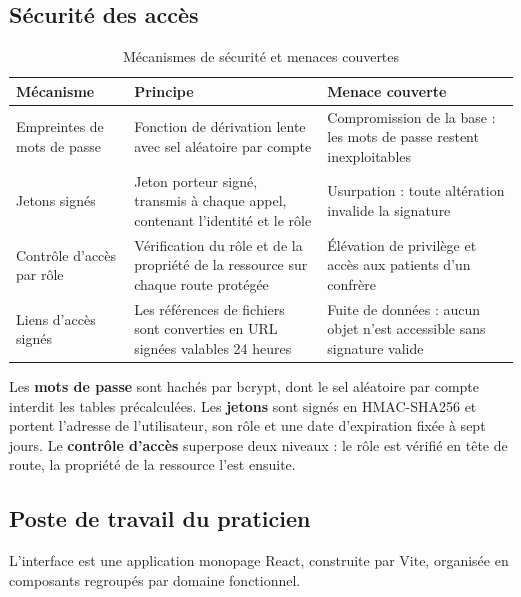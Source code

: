 
\subsection{Sécurité des accès}

\begin{table}[H]
\centering

\small
\begin{tabular}{@{}L{3.2cm}L{5.3cm}L{5.5cm}@{}}
\toprule
\textbf{Mécanisme} & \textbf{Principe} & \textbf{Menace couverte} \\
\midrule
Empreintes de mots de passe &
Fonction de dérivation lente avec sel aléatoire par compte &
Compromission de la base : les mots de passe restent inexploitables \\
\addlinespace[3pt]
Jetons signés &
Jeton porteur signé, transmis à chaque appel, contenant l'identité et le rôle &
Usurpation : toute altération invalide la signature \\
\addlinespace[3pt]
Contrôle d'accès par rôle &
Vérification du rôle et de la propriété de la ressource sur chaque route protégée &
Élévation de privilège et accès aux patients d'un confrère \\
\addlinespace[3pt]
Liens d'accès signés &
Les références de fichiers sont converties en URL signées valables 24 heures &
Fuite de données : aucun objet n'est accessible sans signature valide \\
\bottomrule
\end{tabular}
\caption{Mécanismes de sécurité et menaces couvertes}
\label{tab:secu}
\end{table}

Les \textbf{mots de passe} sont hachés par bcrypt, dont le sel aléatoire par compte
interdit les tables précalculées. Les \textbf{jetons} sont signés en HMAC-SHA256 et portent
l'adresse de l'utilisateur, son rôle et une date d'expiration fixée à sept jours. Le
\textbf{contrôle d'accès} superpose deux niveaux : le rôle est vérifié en tête de route, la
propriété de la ressource l'est ensuite.

\subsection{Poste de travail du praticien}

L'interface est une application monopage React, construite par Vite, organisée en
composants regroupés par domaine fonctionnel.

